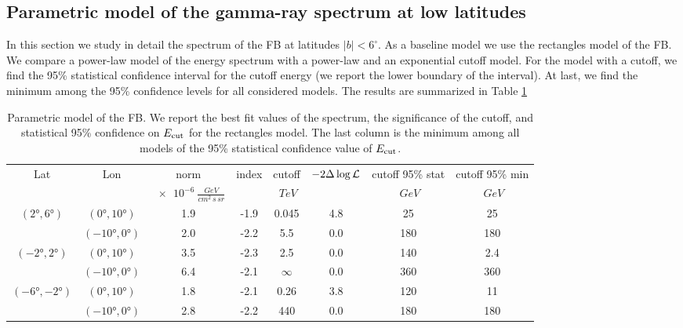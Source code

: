 \subsection{Parametric model of the gamma-ray spectrum at low latitudes}
\label{sec:param_model}

In this section we study in detail the spectrum of the FB at latitudes $|b| < 6^\circ$.
As a baseline model we use the rectangles model of the FB.
We compare a power-law model of the energy spectrum with a power-law and an exponential cutoff model.
For the model with a cutoff, we find the 95\% statistical confidence interval for the cutoff energy 
(we report the lower boundary of the interval).
At last, we find the minimum among the 95\% confidence levels for all considered models.
The results are summarized in Table \ref{tab:param}

\begin{table}
  \begin{center}
    \caption{Parametric model of the FB. We report the best fit values of the spectrum, the significance of the cutoff, 
    and statistical 95\% confidence on $E_{\rm cut}$ for the rectangles model.
    The last column is the minimum among all models of the 95\% statistical confidence value of $E_{\rm cut}$.}
    \label{tab:param}
    \begin{tabular}{|c|c|c|c|c|c|c|c|} %
     	\hline
		 Lat & Lon  & norm & index & cutoff &  $-2 \Delta \log {\mathcal{L}}$ & cutoff 95\% stat & cutoff 95\% min \\ 
		       &        &  $\SI{e-6}{\frac{GeV}{cm^{2}\, s\, sr}}$ &  & $\SI{}{TeV}$ & & $\SI{}{GeV}$ & $\SI{}{GeV}$ \\ 
		\hline
  		$(\ang{2}, \ang{6})$ & $(\ang{0}, \ang{10})$ & 1.9  & -1.9 & 0.045 & 4.8 & 25 & 25 \\ 
		& $(\ang{-10}, \ang{0})$ & 2.0  & -2.2 & 5.5 & 0.0 & 180 & 180  \\ 
 		\hline
  		$(\ang{-2}, \ang{2})$ & $(\ang{0}, \ang{10})$  & 3.5  & -2.3 & 2.5 & 0.0 & 140 & 2.4  \\ 
		& $(\ang{-10}, \ang{0})$  & 6.4  & -2.1 & $\infty$ & 0.0 & 360 & 360   \\ 
 		\hline
  		$(\ang{-6}, \ang{-2})$ & $(\ang{0}, \ang{10})$  & 1.8  & -2.1 & 0.26 & 3.8 & 120 & 11  \\ 
		& $(\ang{-10}, \ang{0})$ & 2.8  & -2.2 & 440 & 0.0 & 180 & 180 \\ 
 \hline
    \end{tabular}
  \end{center}
\end{table}




